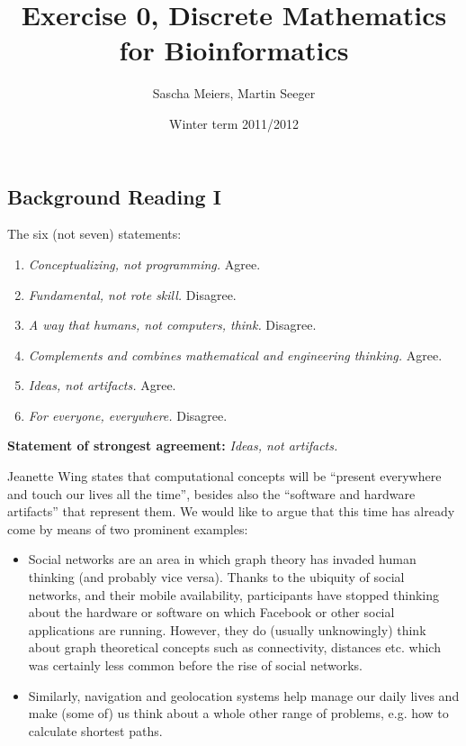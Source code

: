 \documentclass[a4paper]{article}
\author{Sascha Meiers, Martin Seeger}
\title{Exercise 0, Discrete Mathematics for Bioinformatics}
\date{Winter term 2011/2012}
\begin{document}
\maketitle


\subsection{Background Reading I}

The six (not seven) statements: 

\begin{enumerate}
  \item {\it Conceptualizing, not programming.} Agree.
  \item {\it Fundamental, not rote skill.} Disagree.
  \item {\it A way that humans, not computers, think.} Disagree.
  \item {\it Complements and combines mathematical and engineering thinking.}
  Agree.
  \item {\it Ideas, not artifacts.} Agree.
  \item {\it For everyone, everywhere.} Disagree.
\end{enumerate}

{\bf Statement of strongest agreement:} {\it Ideas, not artifacts.}

Jeanette Wing states that computational concepts will be ``present everywhere and
touch our lives all the time'', besides also the ``software and hardware
artifacts'' that represent them. We would like to argue that this time has
already come by means of two prominent examples:
\begin{itemize}
  \item Social networks are an area in which graph theory has invaded human
  thinking (and probably vice versa). Thanks to the ubiquity of social networks,
  and their mobile availability, participants have stopped thinking about the
  hardware or software on which Facebook or other social applications are
  running. However, they do (usually unknowingly) think about graph 
  theoretical concepts such as connectivity, distances etc. which was certainly less common before the rise
  of social networks.
  \item Similarly, navigation and geolocation systems help manage our daily
  lives and make (some of) us think about a whole other range of problems, e.g.
  how to calculate shortest paths.
\end{itemize}
\end{document}
